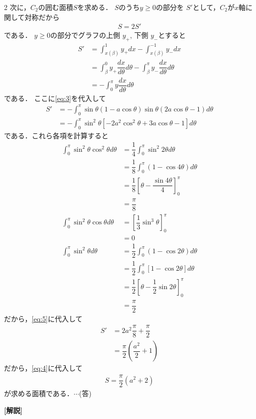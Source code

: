 \documentclass[../../main.tex]{subfiles}
\begin{document}
\begin{multicols}{2}
  次に，$C_2$の囲む面積$S$を求める．
  $S$のうち$y \ge 0$の部分を $S'$として，$C_2$が$x$軸に関して対称だから
  \begin{align}
    S = 2S' \label{eq:4}
  \end{align}
  である．
  $y\ge 0$の部分でグラフの上側 $y_+$, 下側 $y_-$とすると
  \begin{align}
    S'
    & = \int_{x(\beta)}^{1} y_+ dx - \int_{x(\beta)}^{-1} y_- dx                                                \\
    & = \int_{\beta}^{0} y_{+} \dfrac{dx}{d\theta} d\theta - \int_{\beta}^{\pi} y_{-} \dfrac{dx}{d\theta} d\theta \\
    & = -\int_{0}^{\pi} y \dfrac{dx}{d\theta} d\theta
  \end{align}
  である．
  ここに\cref{eq:3}を代入して
  \begin{align}
    S'
    & = -\int_{0}^{\pi} \sin\theta\left(1-a\cos\theta\right) \sin\theta\left(2a\cos\theta-1\right) d\theta          \\
    & = -\int_{0}^{\pi} \sin^2\theta \left[-2a^2\cos^2\theta + 3a\cos\theta -1 \right] d\theta  \label{eq:5}
  \end{align}
  である．これら各項を計算すると
  \begin{align}
    \int_{0}^{\pi}\sin^2\theta\cos^2\theta d\theta
    & =    \dfrac{1}{4}\int_{0}^{\pi} \sin^2 2\theta d\theta                  \\
    & =    \dfrac{1}{8}\int_{0}^{\pi} \left(1-\cos 4\theta\right) d\theta     \\
    & =    \dfrac{1}{8} \left[\theta-\dfrac{\sin 4\theta}{4}\right]_{0}^{\pi}  \\
    & =    \dfrac{\pi}{8}                                                     \\
    \int_{0}^{\pi}\sin^2\theta\cos\theta d\theta
    & = \left[\dfrac{1}{3}\sin^3\theta\right]_{0}^{\pi}                       \\
    & = 0                                                                    \\
    \int_{0}^{\pi}\sin^2\theta d\theta
    & =    \dfrac{1}{2} \int_{0}^{\pi}\left(1-\cos 2\theta\right) d\theta     \\
    & =    \dfrac{1}{2} \int_{0}^{\pi}\left[1-\cos 2\theta\right] d\theta     \\
    & =    \dfrac{1}{2} \left[\theta-\dfrac{1}{2}\sin 2\theta\right]_{0}^{\pi} \\
    & =    \dfrac{\pi}{2}
  \end{align}
  だから，\cref{eq:5}に代入して
  \begin{align}
    S'
    & = 2a^2\dfrac{\pi}{8} + \dfrac{\pi}{2}         \\
    & = \dfrac{\pi}{2}\left(\dfrac{a^2}{2}+1\right)
  \end{align}
  だから，\cref{eq:4}に代入して
  \begin{align}
    S = \dfrac{\pi}{2}\left(a^2+2\right)
  \end{align}
  が求める面積である．$\cdots$(答)

  {\bf [解説]}
  \newpage
\end{multicols}
\end{document}
